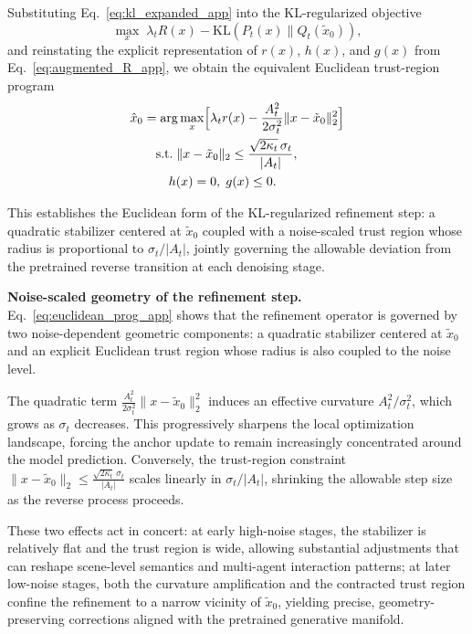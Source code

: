 \documentclass[10pt,twocolumn,letterpaper]{article}
\theoremstyle{plain}
\theoremstyle{remark}
\renewcommand{\paragraph}[1]{\vspace{.5em}\noindent\textbf{#1.}}
\begin{document}
Substituting Eq.~\eqref{eq:kl_expanded_app} into the
KL-regularized objective
\begin{equation}
\max_x\;
\lambda_t R(x)
-
\mathrm{KL}\!\left(P_t(x)\|Q_t(\tilde{x}_0)\right),
\label{eq:kl_obj_app}
\end{equation}
and reinstating the explicit representation of
\(r(x)\), \(h(x)\), and \(g(x)\) from
Eq.~\eqref{eq:augmented_R_app}, we obtain the
equivalent Euclidean trust-region program
\begin{align}
\hat{x}_0
&=
\arg\max_x
\Bigl[
\lambda_t r(x)
-
\frac{A_t^2}{2\sigma_t^2}
\|x-\tilde{x}_0\|_2^2
\Bigr]
\nonumber \\
&\quad\text{s.t.}\;
\|x-\tilde{x}_0\|_2
\le
\frac{\sqrt{2\kappa_t}\,\sigma_t}{|A_t|},\nonumber\\
&\qquad
h(x)=0,\;
g(x)\le0.
\label{eq:euclidean_prog_app}
\end{align}

This establishes the Euclidean form of the KL-regularized
refinement step: a quadratic stabilizer centered at
\(\tilde{x}_0\) coupled with a noise-scaled trust region
whose radius is proportional to \(\sigma_t/|A_t|\), jointly
governing the allowable deviation from the pretrained
reverse transition at each denoising stage.

\paragraph{Noise-scaled geometry of the refinement step}
Eq.~\eqref{eq:euclidean_prog_app} shows that the refinement
operator is governed by two noise-dependent geometric
components:  
a quadratic stabilizer centered at \(\tilde{x}_0\) and an
explicit Euclidean trust region whose radius is also coupled to
the noise level.

The quadratic term  
\(
\frac{A_t^{2}}{2\sigma_t^{2}}\|x-\tilde{x}_0\|_2^{2}
\)
induces an effective curvature
\(
A_t^{2}/\sigma_t^{2}
\),
which grows as \(\sigma_t\) decreases.  
This progressively sharpens the local optimization landscape,
forcing the anchor update to remain increasingly concentrated
around the model prediction.  
Conversely, the trust-region constraint  
\(
\|x-\tilde{x}_0\|_2
\le
\frac{\sqrt{2\kappa_t}\,\sigma_t}{|A_t|}
\)
scales linearly in \(\sigma_t/|A_t|\), shrinking the allowable
step size as the reverse process proceeds.

These two effects act in concert:  
at early high-noise stages, the stabilizer is relatively flat and
the trust region is wide, allowing substantial adjustments that
can reshape scene-level semantics and multi-agent interaction
patterns;  
at later low-noise stages, both the curvature amplification and
the contracted trust region confine the refinement to a narrow
vicinity of \(\tilde{x}_0\), yielding precise, geometry-preserving
corrections aligned with the pretrained generative manifold.
\end{document}
